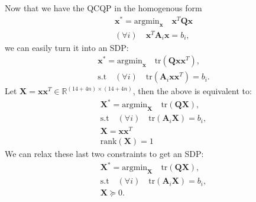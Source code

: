 \documentclass{article}
\begin{document}
Now that we have the QCQP in the homogenous form
\begin{align}
\mathbf{x}^* = \text{argmin}_{\mathbf{x}} \quad \mathbf{x}^T \mathbf{Q} \mathbf{x}\\
(\forall i) \quad \mathbf{x}^T \mathbf{A}_i \mathbf{x} = b_i,
\end{align}
we can easily turn it into an SDP:
\begin{align}
\mathbf{x}^* = \text{argmin}_{\mathbf{x}} \quad \text{tr}(\mathbf{Q}\mathbf{x}\mathbf{x}^T),\\
\text{s.t}\quad (\forall i) \quad \text{tr}(\mathbf{A}_i \mathbf{x} \mathbf{x}^T) = b_i.
\end{align}
Let $\mathbf{X} = \mathbf{x}\mathbf{x}^T \in \mathbb{R}^{(14 + 4n) \times (14 + 4n)}$, then the above is equivalent to:
\begin{align}
\mathbf{X}^* = \text{argmin}_{\mathbf{X}} \quad \text{tr}(\mathbf{Q}\mathbf{X}),\\
\text{s.t}\quad (\forall i) \quad \text{tr}(\mathbf{A}_i \mathbf{X}) = b_i,\\
\mathbf{X} = \mathbf{x} \mathbf{x}^T\\
\text{rank}(\mathbf{X}) = 1
\end{align}
We can relax these last two constraints to get an SDP:
\begin{align}
\mathbf{X}^* = \text{argmin}_{\mathbf{X}} \quad \text{tr}(\mathbf{Q}\mathbf{X}),\\
\text{s.t}\quad (\forall i) \quad \text{tr}(\mathbf{A}_i \mathbf{X}) = b_i,\\
\mathbf{X} \succeq 0.
\end{align}
\end{document}
